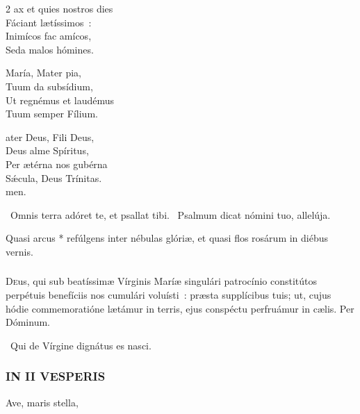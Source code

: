 \documentclass[9pt,twoside]{extarticle}
\begin{document}
\begin{multicols}{2}
\smallskip
\noindent {}ax et quies nostros dies\\
Fáciant lætíssimos~:\\
Inimícos fac amícos,\\
Seda malos hómines.

\smallskip
\noindent {} María, Mater pia,\\
Tuum da subsídium,\\
Ut regnémus et laudémus\\
Tuum semper Fílium.

\smallskip
\noindent {}ater Deus, Fili Deus,\\
Deus alme Spíritus,\\
Per ætérna nos gubérna\\
Sǽcula, Deus Trínitas.\\
{\null \hfill {}men.}

\smallskip
{}~Omnis terra adóret te, et psallat tibi. ~Psalmum dicat nómini tuo, allelúja.

\smallskip 
{} Quasi arcus * refúlgens inter nébulas glóriæ, et quasi flos rosárum in diébus vernis.

\subsubsection*{\center {}}
\lettrine{D}{e}us, qui sub beatíssimæ Vírginis Maríæ singulári patrocínio constitútos perpétuis benefíciis nos cumulári voluísti~: præsta supplícibus tuis; ut, cujus hódie commemoratióne lætámur in terris, ejus conspéctu perfruámur in cælis. Per Dóminum.

\smallskip
\small {}


~Qui de Vírgine dignátus es nasci. 

\normalsize

\subsubsection*{\center \normalfont \textsc{IN II VESPERIS}}

\smallskip
\small {} Ave, maris stella, 


\end{multicols}
\end{document}
